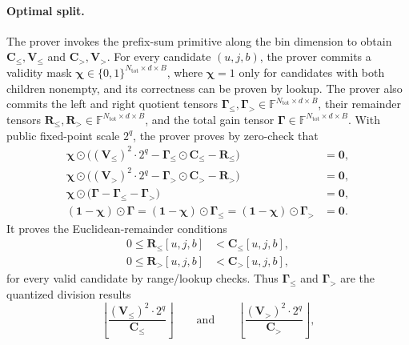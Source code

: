 \paragraph{Optimal split.}
The prover invokes the prefix-sum primitive along the bin dimension to obtain
$\mathbf{C}_{\leq},\mathbf{V}_{\leq}$ and
$\mathbf{C}_{>},\mathbf{V}_{>}$.
For every candidate $(u,j,b)$, the prover commits a validity mask
$\boldsymbol{\chi}\in\{0,1\}^{N_{\mathrm{tot}}\times d\times B}$, where
$\boldsymbol{\chi}=1$ only for candidates with both children nonempty, and its
correctness can be proven by lookup. The prover also commits the left and right
quotient tensors
$\boldsymbol{\Gamma}_{\leq},\boldsymbol{\Gamma}_{>}
\in\mathbb{F}^{N_{\mathrm{tot}}\times d\times B}$, their remainder tensors
$\mathbf{R}_{\leq},\mathbf{R}_{>}
\in\mathbb{F}^{N_{\mathrm{tot}}\times d\times B}$, and the total gain tensor
$\boldsymbol{\Gamma}\in\mathbb{F}^{N_{\mathrm{tot}}\times d\times B}$.
With public fixed-point scale $2^q$, the prover proves by zero-check that
\begin{align}
    \boldsymbol{\chi}\odot
    \bigl(
    (\mathbf{V}_{\leq})^2\cdot 2^q
    -\boldsymbol{\Gamma}_{\leq}\odot\mathbf{C}_{\leq}
    -\mathbf{R}_{\leq}
    \bigr)
    &=\mathbf{0},\\
    \boldsymbol{\chi}\odot
    \bigl(
    (\mathbf{V}_{>})^2\cdot 2^q
    -\boldsymbol{\Gamma}_{>}\odot\mathbf{C}_{>}
    -\mathbf{R}_{>}
    \bigr)
    &=\mathbf{0},\\
    \boldsymbol{\chi}\odot
    \bigl(
    \boldsymbol{\Gamma}
    -\boldsymbol{\Gamma}_{\leq}
    -\boldsymbol{\Gamma}_{>}
    \bigr)
    &=\mathbf{0},\\
    (\mathbf{1}-\boldsymbol{\chi})\odot\boldsymbol{\Gamma}
    =
    (\mathbf{1}-\boldsymbol{\chi})\odot\boldsymbol{\Gamma}_{\leq}
    =
    (\mathbf{1}-\boldsymbol{\chi})\odot\boldsymbol{\Gamma}_{>}
    &=
    \mathbf{0}.
\end{align}
It proves the Euclidean-remainder conditions
\begin{align}
    0\leq \mathbf{R}_{\leq}[u,j,b] &< \mathbf{C}_{\leq}[u,j,b],\\
    0\leq \mathbf{R}_{>}[u,j,b] &< \mathbf{C}_{>}[u,j,b],
\end{align}
for every valid candidate by range/lookup checks. Thus
$\boldsymbol{\Gamma}_{\leq}$ and $\boldsymbol{\Gamma}_{>}$ are the quantized
division results
\[
    \left\lfloor
    \frac{(\mathbf{V}_{\leq})^2\cdot 2^q}{\mathbf{C}_{\leq}}
    \right\rfloor
    \qquad\text{and}\qquad
    \left\lfloor
    \frac{(\mathbf{V}_{>})^2\cdot 2^q}{\mathbf{C}_{>}}
    \right\rfloor,
\]
